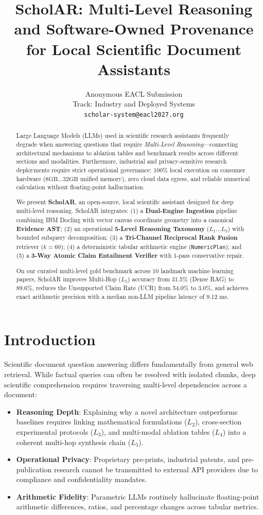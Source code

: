 \documentclass[11pt,a4paper]{article}
\title{\textbf{ScholAR: Multi-Level Reasoning and Software-Owned Provenance for Local Scientific Document Assistants}}
\author{
  Anonymous EACL Submission \\
  Track: Industry and Deployed Systems \\
  \texttt{scholar-system@eacl2027.org}
}
\begin{document}
\maketitle

\begin{abstract}
Large Language Models (LLMs) used in scientific research assistants frequently degrade when answering questions that require \textit{Multi-Level Reasoning}---connecting architectural mechanisms to ablation tables and benchmark results across different sections and modalities. Furthermore, industrial and privacy-sensitive research deployments require strict operational governance: 100\% local execution on consumer hardware ($8\text{GB}\dots 32\text{GB}$ unified memory), zero cloud data egress, and reliable numerical calculation without floating-point hallucination.

We present \textbf{ScholAR}, an open-source, local scientific assistant designed for deep multi-level reasoning. ScholAR integrates: (1) a \textbf{Dual-Engine Ingestion} pipeline combining IBM Docling with vector canvas coordinate geometry into a canonical \textbf{Evidence AST}; (2) an operational \textbf{5-Level Reasoning Taxonomy} ($L_1 \dots L_5$) with bounded subquery decomposition; (3) a \textbf{Tri-Channel Reciprocal Rank Fusion} retriever ($k=60$); (4) a deterministic tabular arithmetic engine (\texttt{NumericPlan}); and (5) a \textbf{3-Way Atomic Claim Entailment Verifier} with 1-pass conservative repair. 

On our curated multi-level gold benchmark across 10 landmark machine learning papers, ScholAR improves Multi-Hop ($L_5$) accuracy from 31.5\% (Dense RAG) to 89.6\%, reduces the Unsupported Claim Rate (UCR) from 54.0\% to 3.0\%, and achieves exact arithmetic precision with a median non-LLM pipeline latency of 9.12 ms.
\end{abstract}

\section{Introduction}
Scientific document question answering differs fundamentally from general web retrieval. While factual queries can often be resolved with isolated chunks, deep scientific comprehension requires traversing multi-level dependencies across a document:
\begin{itemize}
    \item \textbf{Reasoning Depth}: Explaining why a novel architecture outperforms baselines requires linking mathematical formulations ($L_2$), cross-section experimental protocols ($L_3$), and multi-modal ablation tables ($L_4$) into a coherent multi-hop synthesis chain ($L_5$).
    \item \textbf{Operational Privacy}: Proprietary pre-prints, industrial patents, and pre-publication research cannot be transmitted to external API providers due to compliance and confidentiality mandates.
    \item \textbf{Arithmetic Fidelity}: Parametric LLMs routinely hallucinate floating-point arithmetic differences, ratios, and percentage changes across tabular metrics.
\end{itemize}
\end{document}
